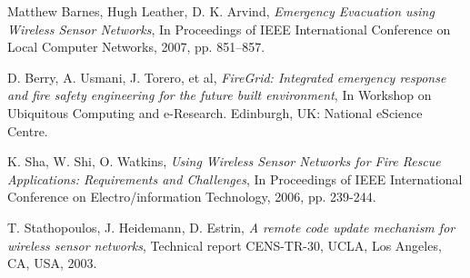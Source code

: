 \documentclass{../local}
\begin{document}
\begin{thebibliography}{9}

 Matthew Barnes, Hugh Leather, D. K. Arvind, \emph{Emergency Evacuation using Wireless Sensor Networks}, In Proceedings of IEEE International Conference on Local Computer Networks, 2007, pp. 851–857.

D. Berry, A. Usmani, J. Torero, et al, \emph{FireGrid: Integrated
emergency response and fire safety engineering for the future built environment}, In Workshop on
Ubiquitous Computing and e-Research. Edinburgh, UK: National eScience Centre.

 K. Sha, W. Shi, O. Watkins, \emph{Using Wireless Sensor Networks for Fire Rescue Applications: Requirements and Challenges}, In Proceedings of IEEE International Conference on Electro/information Technology, 2006, pp. 239-244.

 T. Stathopoulos, J. Heidemann, D. Estrin, \emph{A remote code update mechanism for wireless sensor networks}, Technical report CENS-TR-30, UCLA, Los Angeles, CA, USA, 2003.

\end{thebibliography}
\end{document}
